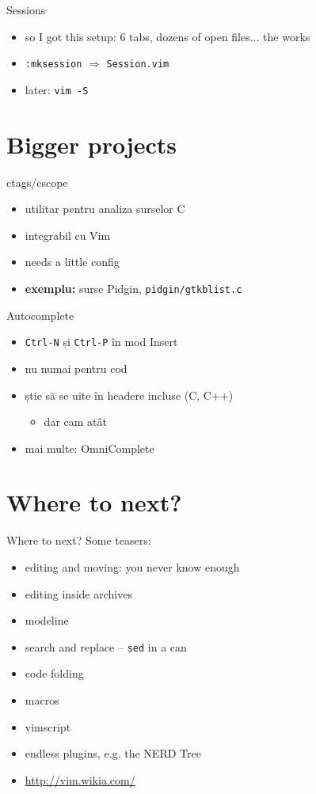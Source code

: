 \documentclass{beamer}
\begin{document}
\begin{frame}{Sessions}
  \begin{itemize}
    \item so I got this setup: 6 tabs, dozens of open files... the works
    \item \texttt{:mksession} $\Rightarrow$ \texttt{Session.vim}
    \item later: \texttt{vim -S}
  \end{itemize}
\end{frame}

\section{Bigger projects}
\begin{frame}{ctags/cscope}
  \begin{itemize}
    \item utilitar pentru analiza surselor C
    \item integrabil cu Vim
    \item needs a little config
    \pause
    \item \textbf{exemplu:} surse Pidgin, \texttt{pidgin/gtkblist.c}
  \end{itemize}
\end{frame}

\begin{frame}{Autocomplete}
  \begin{itemize}
    \item \texttt{Ctrl-N} și \texttt{Ctrl-P} în mod Insert
    \item nu numai pentru cod
    \item știe să se uite în headere incluse (C, C++)
    \pause
      \begin{itemize}
        \item dar cam atât
      \end{itemize}
    \pause
    \item mai multe: OmniComplete
  \end{itemize}
\end{frame}

\section{Where to next?}
\begin{frame}{Where to next?}
  Some teasers:
  \begin{itemize}
    \item editing and moving: you never know enough
    \item editing inside archives
    \item modeline
    \item search and replace -- \texttt{sed} in a can
    \item code folding
    \item macros
    \item vimscript
    \item endless plugins, e.g. the NERD Tree
    \item \url{http://vim.wikia.com/}
  \end{itemize}
\end{frame}
\end{document}
